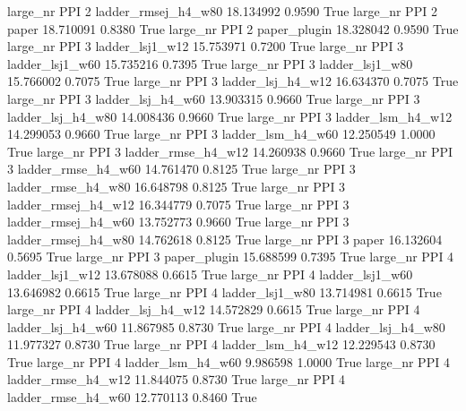   large_nr      PPI                 2 ladder_rmsej_h4_w80   18.134992      0.9590    True
  large_nr      PPI                 2               paper   18.710091      0.8380    True
  large_nr      PPI                 2        paper_plugin   18.328042      0.9590    True
  large_nr      PPI                 3     ladder_lsj1_w12   15.753971      0.7200    True
  large_nr      PPI                 3     ladder_lsj1_w60   15.735216      0.7395    True
  large_nr      PPI                 3     ladder_lsj1_w80   15.766002      0.7075    True
  large_nr      PPI                 3   ladder_lsj_h4_w12   16.634370      0.7075    True
  large_nr      PPI                 3   ladder_lsj_h4_w60   13.903315      0.9660    True
  large_nr      PPI                 3   ladder_lsj_h4_w80   14.008436      0.9660    True
  large_nr      PPI                 3   ladder_lsm_h4_w12   14.299053      0.9660    True
  large_nr      PPI                 3   ladder_lsm_h4_w60   12.250549      1.0000    True
  large_nr      PPI                 3  ladder_rmse_h4_w12   14.260938      0.9660    True
  large_nr      PPI                 3  ladder_rmse_h4_w60   14.761470      0.8125    True
  large_nr      PPI                 3  ladder_rmse_h4_w80   16.648798      0.8125    True
  large_nr      PPI                 3 ladder_rmsej_h4_w12   16.344779      0.7075    True
  large_nr      PPI                 3 ladder_rmsej_h4_w60   13.752773      0.9660    True
  large_nr      PPI                 3 ladder_rmsej_h4_w80   14.762618      0.8125    True
  large_nr      PPI                 3               paper   16.132604      0.5695    True
  large_nr      PPI                 3        paper_plugin   15.688599      0.7395    True
  large_nr      PPI                 4     ladder_lsj1_w12   13.678088      0.6615    True
  large_nr      PPI                 4     ladder_lsj1_w60   13.646982      0.6615    True
  large_nr      PPI                 4     ladder_lsj1_w80   13.714981      0.6615    True
  large_nr      PPI                 4   ladder_lsj_h4_w12   14.572829      0.6615    True
  large_nr      PPI                 4   ladder_lsj_h4_w60   11.867985      0.8730    True
  large_nr      PPI                 4   ladder_lsj_h4_w80   11.977327      0.8730    True
  large_nr      PPI                 4   ladder_lsm_h4_w12   12.229543      0.8730    True
  large_nr      PPI                 4   ladder_lsm_h4_w60    9.986598      1.0000    True
  large_nr      PPI                 4  ladder_rmse_h4_w12   11.844075      0.8730    True
  large_nr      PPI                 4  ladder_rmse_h4_w60   12.770113      0.8460    True
